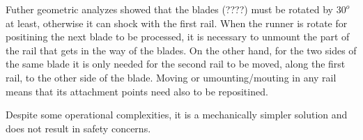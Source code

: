 
  Futher geometric analyzes showed that the blades (????) must be rotated by
  $30^o$ at least, otherwise it can shock with the first rail. When the runner
  is rotate for positining the next blade to be processed, it is necessary to
  unmount the part of the rail that gets in the way of the blades. On the other
  hand, for the two sides of the same blade it is only needed for the second
  rail to be moved, along the first rail, to the other side of the blade.
  Moving or umounting/mouting in any rail means that its attachment points need
  also to be repositined. 
  
  Despite some operational complexities, it is a mechanically
  simpler solution and does not result in safety concerns.
  

